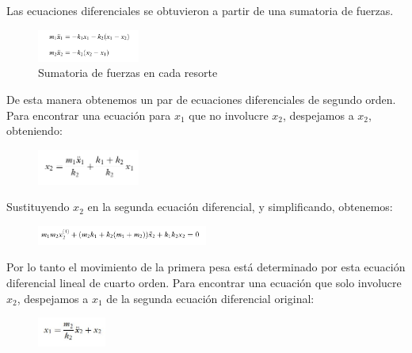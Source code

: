 \documentclass[a4paper]{article}
\begin{document}
Las ecuaciones diferenciales se obtuvieron a partir de una sumatoria de fuerzas.


\begin{figure}[ht!]
\centering
\includegraphics[width=0.3\textwidth]{Ecuacion2_1.png}
\caption{\label{fig:Sistema de resortes acoplados}Sumatoria de fuerzas en cada resorte}
\end{figure}

\newpage
De esta manera obtenemos un par de ecuaciones diferenciales de segundo orden. Para encontrar una ecuación para $x_1$ que no involucre $x_2$, despejamos a $x_2$, obteniendo:


\begin{figure}[ht!]
\centering
\includegraphics[width=0.3\textwidth]{Ecuacion2_2.png}
\end{figure}

Sustituyendo $x_2$ en la segunda ecuación diferencial, y simplificando, obtenemos:


\begin{figure}[ht!]
\centering
\includegraphics[width=0.5\textwidth]{Ecuacion2_3.png}
\end{figure}

Por lo tanto el movimiento de la primera pesa está determinado por esta ecuación diferencial lineal de cuarto orden.
Para encontrar una ecuación que solo involucre $x_2$, despejamos a $x_1$ de la segunda ecuación diferencial original:

\begin{figure}[ht!]
\centering
\includegraphics[width=0.2\textwidth]{Ecuacion_2_4.JPG}
\end{figure}
\end{document}
